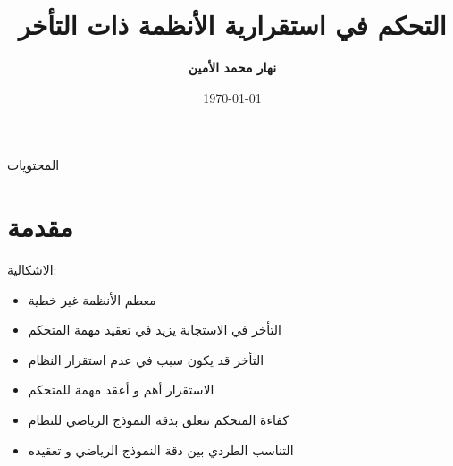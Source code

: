 \documentclass[dvipsnames,mathserif]{beamer}
\begin{document}
\rightskip\rightmargin
\title{التحكم في استقرارية الأنظمة ذات التأخر  }
\author{ \Large \textbf{نهار محمد الأمين} }
\footnotesize{\date{\today }


\begin{frame}
\maketitle
\end{frame}

\begin{frame}{ المحتويات}
\footnotesize \tableofcontents
\end{frame}

\section{مقدمة}
\begin{frame}
\large الاشكالية:
\begin{itemize}
    \item معظم الأنظمة غير خطية
    
    \item التأخر في الاستجابة يزيد في تعقيد مهمة المتحكم
   
    \item التأخر قد يكون سبب في عدم استقرار النظام
    
    \item الاستقرار أهم و أعقد مهمة للمتحكم
    
    \item كفاءة المتحكم تتعلق بدقة النموذج الرياضي للنظام
   
    \item التناسب الطردي بين دقة النموذج الرياضي و تعقيده
    
\end{itemize}
\end{frame}
}
\end{document}
